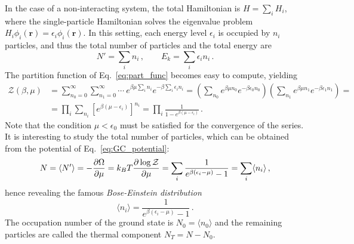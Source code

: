 In the case of a non-interacting system, the total Hamiltonian is $H = \sum_i H_i$, where the single-particle Hamiltonian solves the eigenvalue problem $H_i \phi_i(\mathbf{r}) = \epsilon_i \phi_i(\mathbf{r})$. In this setting, each energy level $\epsilon_i$ is occupied by $n_i$ particles, and thus the total number of particles and the total energy are
\begin{equation*}
    N' = \sum_i n_i\, , \qquad E_k = \sum_i \epsilon_i n_i\, .
\end{equation*}
The partition function of Eq.\ \eqref{eq:part_func} becomes easy to compute, yielding
\begin{equation*}
    \begin{split}
        \mathcal{Z}(\beta, \mu) &= 
        \sum_{n_0 = 0}^\infty \sum_{n_1 = 0}^\infty \cdots\ e^{\beta \mu \sum_i n_i} e^{-\beta \sum_i \epsilon_i n_i} = 
        \left(\sum_{n_0} e^{\beta \mu n_0} e^{-\beta \epsilon_0 n_0}\right)
        \left(\sum_{n_1} e^{\beta \mu n_1} e^{-\beta \epsilon_1 n_1}\right) = \\
        &= \prod_i \sum_{n_i} \left[e^{\beta(\mu -\epsilon_i)}\right]^{n_i} = 
        \prod_i \frac{1}{1-e^{\beta(\mu - \epsilon_i)}}\, .
    \end{split}
\end{equation*}
Note that the condition $\mu < \epsilon_0$ must be satisfied for the convergence of the series. 
It is interesting to study the total number of particles, which can be obtained from the potential of Eq.\ \eqref{eq:GC_potential}:
\begin{equation*}
    N = \langle N' \rangle = -\pdv{\Omega}{\mu} = k_B T \pdv{\log\mathcal{Z}}{\mu} = \sum_i \frac{1}{e^{\beta(\epsilon_i - \mu)}-1} = \sum_i \langle n_i \rangle\, ,
\end{equation*}
hence revealing the famous \textit{Bose-Einstein distribution}
\begin{equation*}
    \langle n_i \rangle = \frac{1}{e^{\beta(\epsilon_i - \mu)}-1}\, .
\end{equation*}
The occupation number of the ground state is $N_0 = \langle n_0 \rangle$ and the remaining particles are called the thermal component $N_T = N - N_0$. 


